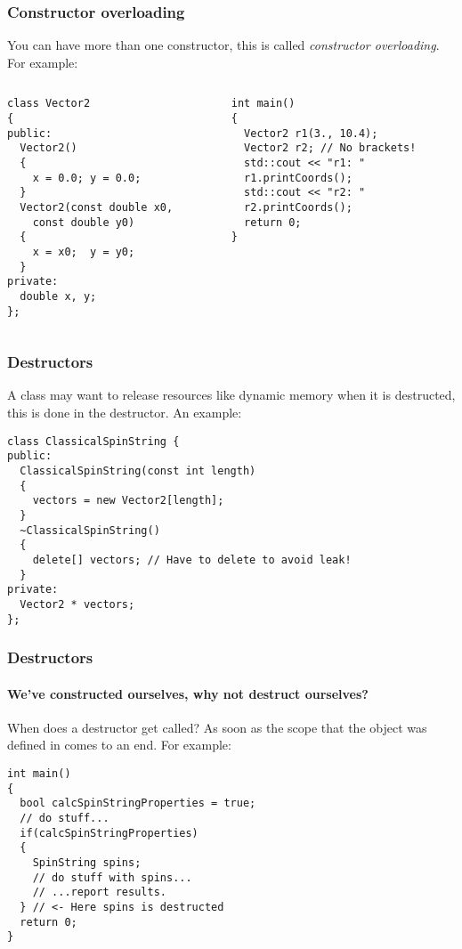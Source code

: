 \documentclass{beamer}
\begin{document}
\begin{frame}[fragile]
  \frametitle{Constructor overloading}
  
  You can have more than one constructor, this is called \textit{constructor overloading}.  For example:
  \begin{columns}[t]
    \begin{column}[T]{0.5\linewidth}
      \begin{lstlisting}[aboveskip=0pt,belowskip=0pt]
class Vector2
{
public:
  Vector2()
  {
    x = 0.0; y = 0.0;
  }
  Vector2(const double x0,
    const double y0)
  {
    x = x0;  y = y0;
  }
private:
  double x, y;
};  
  \end{lstlisting}
    \end{column}
    \begin{column}[T]{0.5\linewidth}
      \begin{lstlisting}[aboveskip=0pt,belowskip=0pt]
int main()
{
  Vector2 r1(3., 10.4);
  Vector2 r2; // No brackets!
  std::cout << "r1: "
  r1.printCoords();
  std::cout << "r2: "
  r2.printCoords();
  return 0;
}
      \end{lstlisting}
    \end{column}
  \end{columns}  

\end{frame}


\begin{frame}[fragile]
  \frametitle{Destructors}
  
	A class may want to release resources like dynamic memory when it is destructed, this is done in the destructor.
  \pause
  An example:
  \begin{lstlisting}[basicstyle=\ttfamily\fontsize{8}{9}\selectfont{},belowskip=0pt]
class ClassicalSpinString {
public:
  ClassicalSpinString(const int length)
  {
    vectors = new Vector2[length];
  }
  ~ClassicalSpinString()
  {
    delete[] vectors; // Have to delete to avoid leak!
  }
private:
  Vector2 * vectors;
};  
  \end{lstlisting}
  
  
\end{frame}

\begin{frame}[fragile]
  \frametitle{Destructors}
  \framesubtitle{We've constructed ourselves, why not destruct ourselves?}
  When does a destructor get called?  As soon as the scope that the object was defined in comes to an end.
  \newline\pause
  For example:
  \begin{lstlisting}
int main()
{
  bool calcSpinStringProperties = true;
  // do stuff...
  if(calcSpinStringProperties)
  {
    SpinString spins;
    // do stuff with spins...
    // ...report results.
  } // <- Here spins is destructed
  return 0;
}
  \end{lstlisting}
  \pause
\end{frame}
\end{document}
